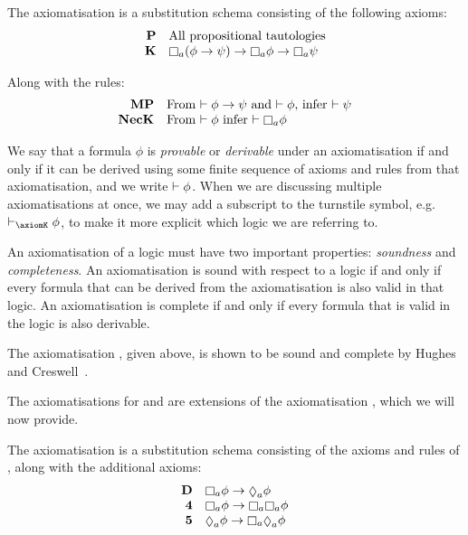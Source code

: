 \begin{definition}\label{pre-axiom-k}
The axiomatisation \axiomK{} is a substitution schema consisting of the
following axioms:
$$
\begin{array}{rl}
{\bf P} & \text{All propositional tautologies}\\
{\bf K} & \knows_a (\phi \implies \psi) \implies \knows_a \phi \implies \knows_a \psi\\
\end{array}
$$

Along with the rules:
$$
\begin{array}{rl}
{\bf MP} & \text{From $\proves \phi \implies \psi$ and $\proves \phi$, infer
$\proves \psi$}\\
{\bf NecK} & \text{From $\proves \phi$ infer $\proves \knows_a \phi$}\\
\end{array}
$$
\end{definition}

We say that a formula $\phi$ is {\em provable} or {\em derivable} under an
axiomatisation if and only if it can be derived using some finite sequence of
axioms and rules from that axiomatisation, and we write $\vdash \phi$. When we
are discussing multiple axiomatisations at once, we may add a subscript to the
turnstile symbol, e.g. $\proves_\axiomK \phi$, to make it more explicit which
logic we are referring to.

An axiomatisation of a logic must have two important properties: {\em soundness}
and {\em completeness}. An axiomatisation is sound with respect to a logic if
and only if every formula that can be derived from the axiomatisation is also
valid in that logic. An axiomatisation is complete if and only if every formula
that is valid in the logic is also derivable.

The axiomatisation \axiomK{}, given above, is shown to be sound and complete by
Hughes and Creswell~\cite{hughes1996new}.

The axiomatisations for \logicKD{} and \logicS{} are extensions of the
axiomatisation \axiomK{}, which we will now provide.

\begin{definition}
The axiomatisation \axiomKD{} is a substitution schema consisting of the axioms
and rules of \axiomK{}, along with the additional axioms:
$$
\begin{array}{rl}
{\bf D} & \knows_a \phi \implies \suspects_a \phi\\
{\bf 4} & \knows_a \phi \implies \knows_a \knows_a \phi\\
{\bf 5} & \suspects_a \phi \implies \knows_a \suspects_a \phi\\
\end{array}
$$
\end{definition}

